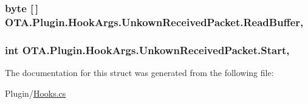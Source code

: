 \subsubsection[{Read\+Buffer}]{\setlength{\rightskip}{0pt plus 5cm}byte \mbox{[}$\,$\mbox{]} O\+T\+A.\+Plugin.\+Hook\+Args.\+Unkown\+Received\+Packet.\+Read\+Buffer\hspace{0.3cm}{\ttfamily [get]}, {\ttfamily [set]}}\label{struct_o_t_a_1_1_plugin_1_1_hook_args_1_1_unkown_received_packet_a65c574a48ec9e18539e4d63823172abb}
\hypertarget{struct_o_t_a_1_1_plugin_1_1_hook_args_1_1_unkown_received_packet_ad97197d58e23b48e207c16828e249cba}{}
\subsubsection[{Start}]{\setlength{\rightskip}{0pt plus 5cm}int O\+T\+A.\+Plugin.\+Hook\+Args.\+Unkown\+Received\+Packet.\+Start\hspace{0.3cm}{\ttfamily [get]}, {\ttfamily [set]}}\label{struct_o_t_a_1_1_plugin_1_1_hook_args_1_1_unkown_received_packet_ad97197d58e23b48e207c16828e249cba}


The documentation for this struct was generated from the following file\+:\begin{DoxyCompactItemize}
\item 
Plugin/\hyperlink{_hooks_8cs}{Hooks.\+cs}\end{DoxyCompactItemize}
